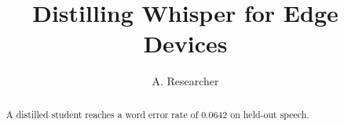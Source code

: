\documentclass[11pt]{article}
\newcommand{\bestwer}{0.0642} %
\begin{document}
\title{Distilling Whisper for Edge Devices}
\author{A. Researcher}
\maketitle

\begin{abstract}
A distilled student reaches a word error rate of \bestwer{} on held-out speech.
\end{abstract}






\end{document}
